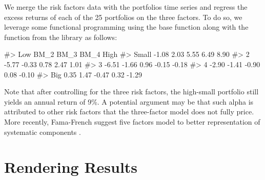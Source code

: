 We merge the risk factors data with the portfolios
time series  and regress the excess returns of each of the 25 portfolios on the three
factors. To do so, we leverage some functional programming
using the  base function along with the 
function from the  library as follows:
\begin{Schunk}
\begin{Soutput}
#>         Low  BM_2  BM_3  BM_4  High
#> Small -1.08  2.03  5.55  6.49  8.90
#> 2     -5.77 -0.33  0.78  2.47  1.01
#> 3     -6.51 -1.66  0.96 -0.15 -0.18
#> 4     -2.90 -1.41 -0.90  0.08 -0.10
#> Big    0.35  1.47 -0.47  0.32 -1.29
\end{Soutput}
\end{Schunk} %

Note that after controlling for the three risk factors, the high-small
portfolio still yields an annual return of 9\%. A potential argument may
be that such alpha is attributed to other risk factors that the
three-factor model does not fully  price. More recently, Fama-French suggest
five factors model to better representation of systematic components
\citep{fama2015five}.

\hypertarget{rendering-results}{%
\section{Rendering Results}\label{rendering-results}}

